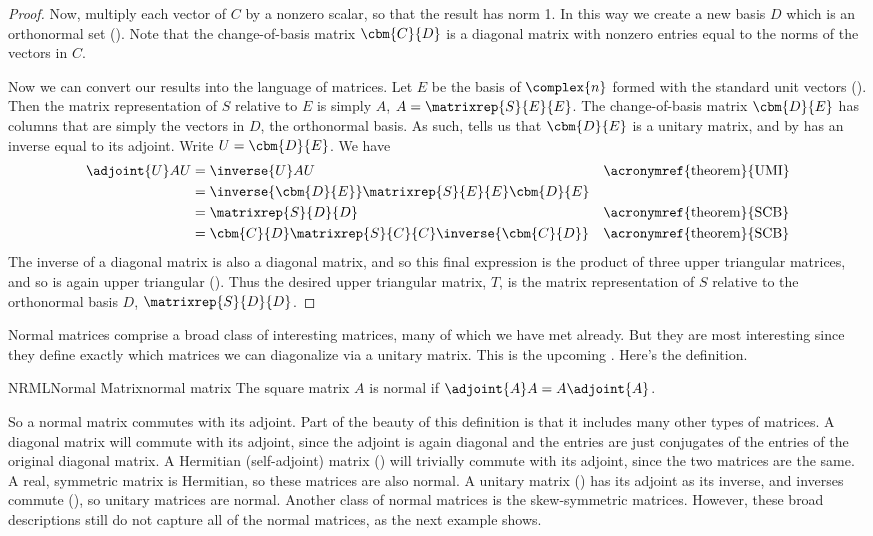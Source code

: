 \begin{proof}
%
Now, multiply each vector of $C$ by a nonzero scalar, so that the result has norm 1.  In this way we create a new basis $D$ which is an orthonormal set ().  Note that the change-of-basis matrix $\cbm{C}{D}$ is a diagonal matrix with nonzero entries equal to the norms of the vectors in $C$.\par
%
Now we can convert our results into the language of matrices.  Let $E$ be the basis of $\complex{n}$ formed with the standard unit vectors ().  Then the matrix representation of $S$ relative to $E$ is simply $A$, $A=\matrixrep{S}{E}{E}$.  The change-of-basis matrix $\cbm{D}{E}$ has columns that are simply the vectors in $D$, the orthonormal basis.  As such,  tells us that $\cbm{D}{E}$ is a unitary matrix, and by  has an inverse equal to its adjoint.  Write $U=\cbm{D}{E}$.  We have
%
\begin{align*}
\adjoint{U}AU
&=\inverse{U}AU&&\text{\acronymref{theorem}{UMI}}\\
&=\inverse{\cbm{D}{E}}\matrixrep{S}{E}{E}\cbm{D}{E}\\
&=\matrixrep{S}{D}{D}&&\text{\acronymref{theorem}{SCB}}\\
&=\cbm{C}{D}\matrixrep{S}{C}{C}\inverse{\cbm{C}{D}}&&\text{\acronymref{theorem}{SCB}}
\end{align*}
%
The inverse of a diagonal matrix is also a diagonal matrix, and so this final expression is the product of three upper triangular matrices, and so is again upper triangular ().  Thus the desired upper triangular matrix, $T$, is the matrix representation of $S$ relative to the orthonormal basis $D$, $\matrixrep{S}{D}{D}$.
%
\end{proof}
%
%
Normal matrices comprise a broad class of interesting matrices, many of which we have met already.  But they are most interesting since they define exactly which matrices we can diagonalize via a unitary matrix.  This is the upcoming .  Here's the definition.
%
\begin{definition}{NRML}{Normal Matrix}{normal matrix}
The square matrix $A$ is normal if $\adjoint{A}A=A\adjoint{A}$.
\end{definition}
%
So a normal matrix commutes with its adjoint.  Part of the beauty of this definition is that it includes many other types of matrices.  A diagonal matrix will commute with its adjoint, since the adjoint is again diagonal and the entries are just conjugates of the entries of the original diagonal matrix.  A Hermitian (self-adjoint) matrix () will trivially commute with its adjoint, since the two matrices are the same.  A real, symmetric matrix is Hermitian, so these matrices are also normal.  A unitary matrix () has its adjoint as its inverse, and inverses commute (), so unitary matrices are normal.  Another class of normal matrices is the skew-symmetric matrices.  However, these broad descriptions still do not capture all of the normal matrices, as the next example shows.
